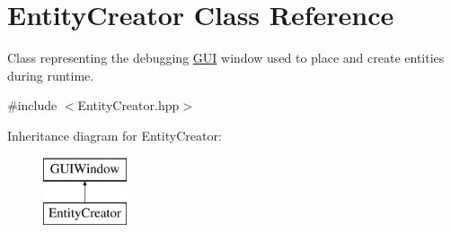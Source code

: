 \hypertarget{class_entity_creator}{}\section{Entity\+Creator Class Reference}
\label{class_entity_creator}


Class representing the debugging \hyperlink{class_g_u_i}{G\+UI} window used to place and create entities during runtime.  




{\ttfamily \#include $<$Entity\+Creator.\+hpp$>$}

Inheritance diagram for Entity\+Creator\+:\begin{figure}[H]
\begin{center}
\leavevmode
\includegraphics[height=2.000000cm]{class_entity_creator}
\end{center}
\end{figure}
